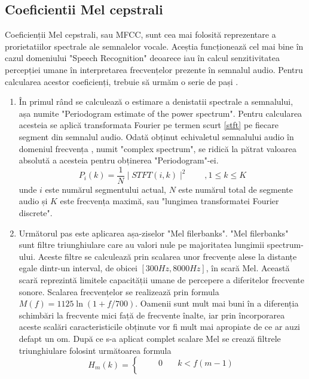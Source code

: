 \documentclass[a4paper,12pt]{book}
\begin{document}
			\subsection{Coeficientii Mel cepstrali}
				Coeficienții Mel cepstrali, sau MFCC, sunt cea mai folosită reprezentare a prorietatiilor spectrale ale semnalelor vocale. Aceștia funcționează cel mai bine în cazul domeniului "Speech Recognition" deoarece iau în calcul senzitivitatea percepției umane în interpretarea frecvențelor prezente în semnalul audio. Pentru calcularea acestor coeficienți, trebuie să urmăm o serie de pași \cite{mcs}.
					\begin{enumerate}
						\item 
							În primul rând se calculează o estimare a denistatii spectrale a semnalului, așa numite "Periodogram estimate of the power spectrum". Pentru calcularea acesteia se aplică transformata Fourier pe termen scurt \ref{stft} pe fiecare segment din semnalul audio. Odată obținut echivaletul semnalului audio în domeniul frecvența , numit "complex spectrum", se ridică la pătrat valoarea absolută a acesteia pentru obținerea "Periodogram"-ei.
							\begin{equation*}
								P_i(k) =\frac{1}{N}\mid STFT(i, k)\mid^2 \quad\quad,1\leq k\leq K
							\end{equation*}
							unde $i$ este numărul segmentului actual, $N$ este numărul total de segmente audio și $K$ este frecvența maximă, sau "lungimea transformatei Fourier discrete".
							\item Următorul pas este aplicarea așa-ziselor "Mel filerbanks". "Mel filerbanks" sunt filtre triunghiulare care au valori nule pe majoritatea lungimii spectrum-ului. Aceste filtre se calculează prin scalarea unor frecvențe alese la distanțe egale dintr-un interval, de obicei $[300Hz, 8000Hz]$, în scară Mel. Această scară reprezintă limitele capacității umane de percepere a diferitelor frecvente sonore. Scalarea frecvențelor se realizează prin formula $M(f) = 1125 \ln(1+ f/700)$. Oamenii sunt mult mai buni în a diferenția schimbări la frecvente mici față de frecvente înalte, iar prin încorporarea aceste scalări caracteristicile obținute vor fi mult mai apropiate de ce ar auzi defapt un om. \newline
							După ce s-a aplicat complet scalare Mel se crează filtrele triunghiulare folosint următoarea formula
						\begin{equation*}
							H_m(k) = 
							\begin{cases}
							\quad \quad 0&\quad k<f(m-1) \\[3pt]

\end{cases}
\end{equation*}
\end{enumerate}
\end{document}
